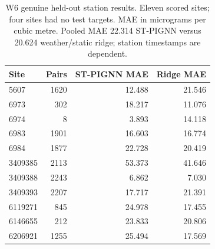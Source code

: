 \begin{table}[t]
\centering
\footnotesize
\caption{W6 genuine held-out station results. Eleven scored sites; four sites had no test targets. MAE in micrograms per cubic metre. Pooled MAE 22.314 ST-PIGNN versus 20.624 weather/static ridge; station timestamps are dependent.}
\label{tab:t04a}
\begin{tabular}{lrrr}
\hline
Site & Pairs & ST-PIGNN MAE & Ridge MAE \\
\hline
5607 & 1620 & 12.488 & 21.546 \\
6973 & 302 & 18.217 & 11.076 \\
6974 & 8 & 3.893 & 14.118 \\
6983 & 1901 & 16.603 & 16.774 \\
6984 & 1877 & 22.728 & 20.419 \\
3409385 & 2113 & 53.373 & 41.646 \\
3409388 & 2243 & 6.862 & 7.030 \\
3409393 & 2207 & 17.717 & 21.391 \\
6119271 & 845 & 24.978 & 17.455 \\
6146655 & 212 & 23.833 & 20.806 \\
6206921 & 1255 & 25.494 & 17.569 \\
\hline
\end{tabular}
\end{table}
